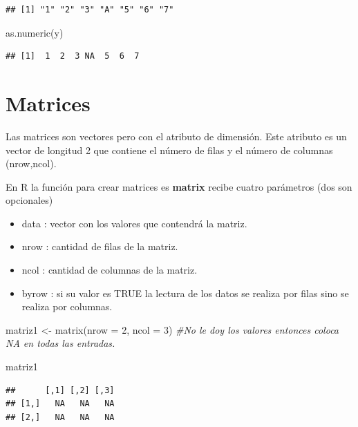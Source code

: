 \documentclass[
  12pt,
]{book}
\newenvironment{Shaded}{\begin{snugshade}}{\end{snugshade}}
\newcommand{\AttributeTok}[1]{\textcolor[rgb]{0.77,0.63,0.00}{#1}}
\newcommand{\CommentTok}[1]{\textcolor[rgb]{0.56,0.35,0.01}{\textit{#1}}}
\newcommand{\DecValTok}[1]{\textcolor[rgb]{0.00,0.00,0.81}{#1}}
\newcommand{\FunctionTok}[1]{\textcolor[rgb]{0.00,0.00,0.00}{#1}}
\newcommand{\NormalTok}[1]{#1}
\newcommand{\OtherTok}[1]{\textcolor[rgb]{0.56,0.35,0.01}{#1}}
\providecommand{\tightlist}{%
  \setlength{\itemsep}{0pt}\setlength{\parskip}{0pt}}
\begin{document}
\begin{verbatim}
## [1] "1" "2" "3" "A" "5" "6" "7"
\end{verbatim}

\begin{Shaded}
\begin{Highlighting}[]
\FunctionTok{as.numeric}\NormalTok{(y)}
\end{Highlighting}
\end{Shaded}

\begin{verbatim}
## [1]  1  2  3 NA  5  6  7
\end{verbatim}

\hypertarget{matrices}{%
\section{\texorpdfstring{\textbf{Matrices}}{Matrices}}\label{matrices}}

Las matrices son vectores pero con el atributo de dimensión. Este atributo es un vector de longitud 2 que contiene el número de filas y el número de columnas (nrow,ncol).

En R la función para crear matrices es \textbf{matrix} recibe cuatro parámetros (dos son opcionales)

\begin{itemize}
\tightlist
\item
  data : vector con los valores que contendrá la matriz.
\item
  nrow : cantidad de filas de la matriz.
\item
  ncol : cantidad de columnas de la matriz.
\item
  byrow : si su valor es TRUE la lectura de los datos se realiza por filas sino se realiza por columnas.
\end{itemize}

\begin{Shaded}
\begin{Highlighting}[]
\NormalTok{matriz1 }\OtherTok{\textless{}{-}} \FunctionTok{matrix}\NormalTok{(}\AttributeTok{nrow =} \DecValTok{2}\NormalTok{, }\AttributeTok{ncol =} \DecValTok{3}\NormalTok{) }\CommentTok{\#No le doy los valores entonces coloca NA en todas las entradas.}

\NormalTok{matriz1 }
\end{Highlighting}
\end{Shaded}

\begin{verbatim}
##      [,1] [,2] [,3]
## [1,]   NA   NA   NA
## [2,]   NA   NA   NA
\end{verbatim}
\end{document}
